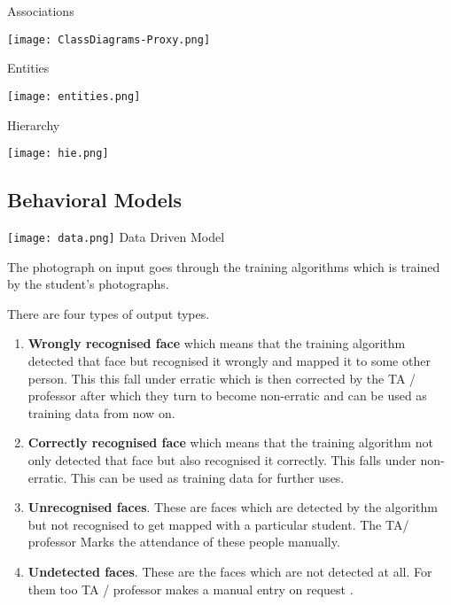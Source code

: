 \documentclass[paper=a4, fontsize=15pt]{scrartcl}
\begin{document}
\begin{center}
{Associations}

\texttt{[image: ClassDiagrams-Proxy.png]} 
\end{center}

\pagebreak
\begin{center}
{Entities}

\texttt{[image: entities.png]} 
\end{center}



\begin{center}
Hierarchy

\texttt{[image: hie.png]}
\end{center}



\subsection{Behavioral Models}


\begin{center}
\texttt{[image: data.png]}
{\Large Data Driven Model}
\end{center}


The photograph on input goes through the training algorithms which is trained by the student's photographs.

There are four types of output types.

\begin{enumerate}
    
    \item \textbf{Wrongly recognised face} which means that the training algorithm detected that face but recognised it wrongly and mapped it to some other person. This this fall under erratic which is then corrected by the TA / professor after which they turn to become non-erratic and can be used as training data from now on.
    \item \textbf{Correctly recognised face} which means that the training algorithm not only detected that face but also recognised it correctly. This falls under non-erratic. This can be used as training data for further uses.
    \item \textbf{Unrecognised faces}. These are faces which are detected by the algorithm but not recognised to get mapped with a particular student. The TA/ professor Marks the attendance of these people manually.
    \item \textbf{Undetected faces}. These are the faces which are not detected at all. For them too TA / professor makes a manual entry on request .

\end{enumerate}
\end{document}
